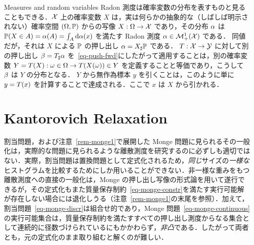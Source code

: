 \begin{rem2}{Measures and random variables}\label{rem-meas-random}
	Radon 測度は確率変数の分布を表すものと見ることもできる．$\mathcal{X}$ 上の確率変数 $X$ は，実は何らかの抽象的な（しばしば明示されない）確率空間 $(\Omega,\mathbb{P})$ からの写像 $X : \Omega \rightarrow \mathcal{X}$ であり，その分布 $\alpha$ は $\mathbb{P}(X \in A) = \alpha(A)=\int_A \mathrm{d}\alpha(x)$ を満たす Radon 測度 $\alpha \in \mathcal{M}_+^1(\mathcal{X})$ である．
	同値だが，それは $X$ による $\mathbb{P}$ の押し出し $\alpha=X_\sharp\mathbb{P}$ である．
	$T : \mathcal{X} \rightarrow \mathcal{Y}$ に対して別の押し出し $\beta = T_\sharp\alpha$ を~\eqref{eq-push-fwd}にしたがって適用することは，別の確率変数 $Y=T(X) : \omega \in \Omega \rightarrow T(X(\omega)) \in Y$ を定義することと等価であり，こうして $\beta$ は $Y$ の分布となる．
	$Y$ から無作為標本 $y$ を引くことは，このように単に $y=T(x)$ を計算することで達成される．ここで $x$ は $X$ から引かれる．
\end{rem2}


\section{Kantorovich Relaxation}\label{sec-kantorovich-relaxation}


割当問題，および注意~\ref{rem-monge1}で展開した Monge 問題に見られるその一般化は，実際的な問題に見られるような離散測度を研究するのに必ずしも適切ではない．実際，割当問題は置換問題として定式化されるため，\emph{同じ}サイズの\emph{一様な}ヒストグラムを比較するためにしか用いることができない．非一様な重みをもつ離散測度への直接の一般化は，Monge の押し出し写像の形式論を用いて遂行できるが，その定式化もまた質量保存制約~\eqref{eq-monge-constr}を満たす実行可能解が存在しない場合には退化しうる（注意~\ref{rem-monge1}の末尾を参照）．加えて，割当問題~\eqref{eq-monge-discr}は組合せ的であり，Monge 問題~\eqref{eq-monge-continuous}の実行可能集合は，質量保存制約を満たすすべての押し出し測度からなる集合として連続的に径数づけられているにもかかわらず，\emph{非凸}である．したがって両者とも，元の定式化のまま取り組むと解くのが難しい．


